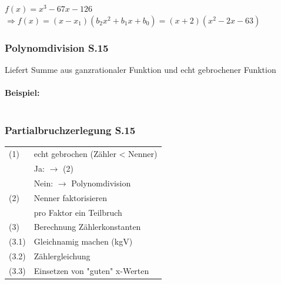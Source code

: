 				$f(x) = x^3-67x-126$\\
				$\Rightarrow f(x) = (x-x_1)(b_2x^2 + b_1x + b_0) = (x+2)(x^2-2x-63)$ 
			
		\subsubsection{Polynomdivision S.15}
			Liefert Summe aus ganzrationaler Funktion und echt gebrochener Funktion\\
			\\
			\textbf{Beispiel:}\\
				\vspace{-5pt}  \\
			
		\subsubsection{Partialbruchzerlegung S.15}
			\begin{tabular}{ll}
				(1) & echt gebrochen (Zähler < Nenner) \\
				    & Ja: $\rightarrow$ (2) \\
					& Nein: $\rightarrow$ Polynomdivision \\
				(2) & Nenner faktorisieren \\
				    & pro Faktor ein Teilbruch \\
				(3) & Berechnung Zählerkonstanten \\
				(3.1) & Gleichnamig machen (kgV) \\
				(3.2) & Zählergleichung \\
				(3.3) & Einsetzen von "guten"  x-Werten \\			
			\end{tabular}
			
